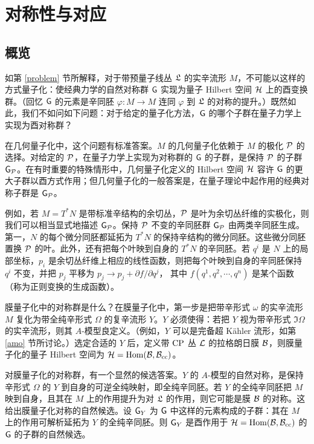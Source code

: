 \section{对称性与对应}\label{symq}

\subsection{概览}\label{oversym}

如第 \ref{problem} 节所解释，对于带预量子线丛 $\frL$ 的实辛流形 $M$，不可能以这样的方式量子化：使经典力学的自然对称群 $\G$ 实现为量子 Hilbert 空间 $\H$ 上的酉变换群。（回忆 $\G$ 的元素是辛同胚 $\varphi:M\to M$ 连同 $\varphi$ 到 $\frL$ 的对称的提升。）既然如此，我们不如问如下问题：对于给定的量子化方法，$\G$ 的哪个子群在量子力学上实现为酉对称群？

在几何量子化中，这个问题有标准答案。$M$ 的几何量子化依赖于 $M$ 的极化 $\P$ 的选择。对给定的 $\P$，在量子力学上实现为对称群的 $\G$ 的子群，是保持 $\P$ 的子群 $\G_\P$。在有时重要的特殊情形中，几何量子化定义的 Hilbert 空间 $\H$ 容许 $\G$ 的更大子群以酉方式作用；但几何量子化的一般答案是，在量子理论中起作用的经典对称子群是 $\G_\P$。

例如，若 $M=T^*N$ 是带标准辛结构的余切丛，$\P$ 是叶为余切丛纤维的实极化，则我们可以相当显式地描述 $\G_\P$。保持 $\P$ 不变的辛同胚群 $\G_\P$ 由两类辛同胚生成。第一，$N$ 的每个微分同胚都延拓为 $T^*N$ 的保持辛结构的微分同胚。这些微分同胚置换 $\P$ 的叶。此外，还有把每个叶映到自身的 $T^*N$ 的辛同胚。若 $q^i$ 是 $N$ 上的局部坐标，$p_i$ 是余切丛纤维上相应的线性函数，则把每个叶映到自身的辛同胚保持 $q^i$ 不变，并把 $p_j$ 平移为
$p_j\to p_j+\partial f/\partial q^j$，
其中 $f(q^1,q^2,\cdots,q^n)$ 是某个函数（称为正则变换的生成函数）。

膜量子化中的对称群是什么？在膜量子化中，第一步是把带辛形式 $\omega$ 的实辛流形 $M$ 复化为带全纯辛形式 $\Omega$ 的复辛流形 $Y$。$Y$ 必须使得：若把 $Y$ 视为带辛形式 $\Im\Omega$ 的实辛流形，则其 $A$-模型良定义。（例如，$Y$ 可以是完备超 Kähler 流形，如第 \ref{amo} 节所讨论。）选定合适的 $Y$ 后，定义带 $\CP$ 丛 $\L$ 的拉格朗日膜 $\B$，则膜量子化的量子 Hilbert 空间为 $\H=\Hom(\B,\B_\cc)$。

对膜量子化的对称群，有一个显然的候选答案。$Y$ 的 $A$-模型的自然对称，是保持辛形式 $\Omega$ 的 $Y$ 到自身的可逆全纯映射，即全纯辛同胚。若 $Y$ 的全纯辛同胚把 $M$ 映到自身，且其在 $M$ 上的作用提升为对 $\frL$ 的作用，则它可能是膜 $\B$ 的对称。这给出膜量子化对称的自然候选。设 $\G_Y$ 为 $\G$ 中这样的元素构成的子群：其在 $M$ 上的作用可解析延拓为 $Y$ 的全纯辛同胚。则 $\G_Y$ 是酉作用于 $\H=\Hom(\B,\B_\cc)$ 的 $\G$ 的子群的自然候选。

